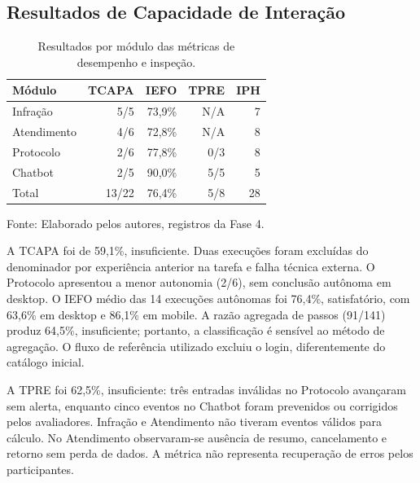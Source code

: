 \documentclass[12pt]{article}
\begin{document}
\subsection{Resultados de Capacidade de Interação}
\begin{table}[htbp]
\centering
\caption{Resultados por módulo das métricas de desempenho e inspeção.}
\begin{tabular}{lrrrr}
\toprule Módulo & TCAPA & IEFO & TPRE & IPH \\ \midrule
Infração & 5/5 & 73,9\% & N/A & 7\\
Atendimento & 4/6 & 72,8\% & N/A & 8\\
Protocolo & 2/6 & 77,8\% & 0/3 & 8\\
Chatbot & 2/5 & 90,0\% & 5/5 & 5\\
Total & 13/22 & 76,4\% & 5/8 & 28\\ \bottomrule
\end{tabular}
\par\small Fonte: Elaborado pelos autores, registros da Fase 4.
\end{table}
A TCAPA foi de 59,1\%, insuficiente. Duas execuções foram excluídas do denominador por experiência anterior na tarefa e falha técnica externa. O Protocolo apresentou a menor autonomia (2/6), sem conclusão autônoma em desktop. O IEFO médio das 14 execuções autônomas foi 76,4\%, satisfatório, com 63,6\% em desktop e 86,1\% em mobile. A razão agregada de passos (91/141) produz 64,5\%, insuficiente; portanto, a classificação é sensível ao método de agregação. O fluxo de referência utilizado excluiu o login, diferentemente do catálogo inicial.

A TPRE foi 62,5\%, insuficiente: três entradas inválidas no Protocolo avançaram sem alerta, enquanto cinco eventos no Chatbot foram prevenidos ou corrigidos pelos avaliadores. Infração e Atendimento não tiveram eventos válidos para cálculo. No Atendimento observaram-se ausência de resumo, cancelamento e retorno sem perda de dados. A métrica não representa recuperação de erros pelos participantes.
\end{document}
